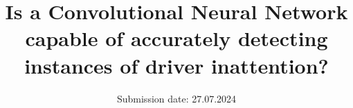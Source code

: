 

\subject{Project Report - Max Möller}
\title{Is a Convolutional Neural Network capable of accurately detecting instances of
driver inattention?}
\date{%
  Submission date: 27.07.2024
}


\maketitle
\thispagestyle{empty}
\tableofcontents
\newpage
{}
\setcounter{page}{1}






\newpage
\nocite{*}
\printbibliography

